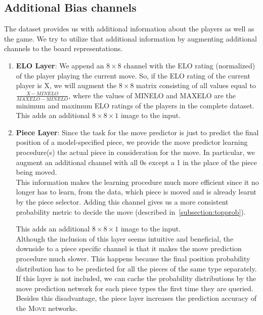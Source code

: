 \subsection{Additional Bias channels}
The dataset provides us with additional information about the players as well as 
the game. We try to utilize that additional information by augmenting additional 
channels to the board representations. 
\begin{enumerate}
\item \textbf{ELO Layer}: We append an $8\times 8$ channel with the ELO rating 
(normalized) of the player playing the current move. So, if the ELO rating of 
the current player is X, we will augment the $8\times 8$ matrix consisting of 
all values equal to $\frac{X-MINELO}{MAXELO-MINELO}$, where the values of MINELO 
and MAXELO are the minimum and maximum ELO ratings of the players in the 
complete dataset. This adds an additional $8\times 8\times 1$ image to the 
input.

\item \textbf{Piece Layer}: Since the task for the move predictor is just to 
predict the final position of a model-specified piece, we provide the move 
predictor learning procedure(s) the actual piece in consideration for the move. 
In particular, we augment an additional channel with all 0s except a 1 in the 
place of the piece being moved.\\
This information makes the learning procedure much more efficient since it no 
longer has to learn, from the data, which piece is moved and is already learnt 
by the piece selector. Adding this channel gives us a more consistent 
probability metric to decide the move (described in~\ref{subsection:topprob}).

This adds an additional $8\times 8\times 1$ image to the input.\\
Although the inclusion of this layer seems intuitive and beneficial, the 
downside to a piece specific channel is that it makes the move prediction 
procedure much slower. This happens because the final position probability 
distribution has to be predicted for all the pieces of the same type separately. 
If this layer is not included, we can cache the probability distributions by the 
move prediction network for each piece types the first time they are queried. 
Besides this disadvantage, the piece layer increases the prediction accuracy of 
the \textsc{Move} networks. 


\end{enumerate}
